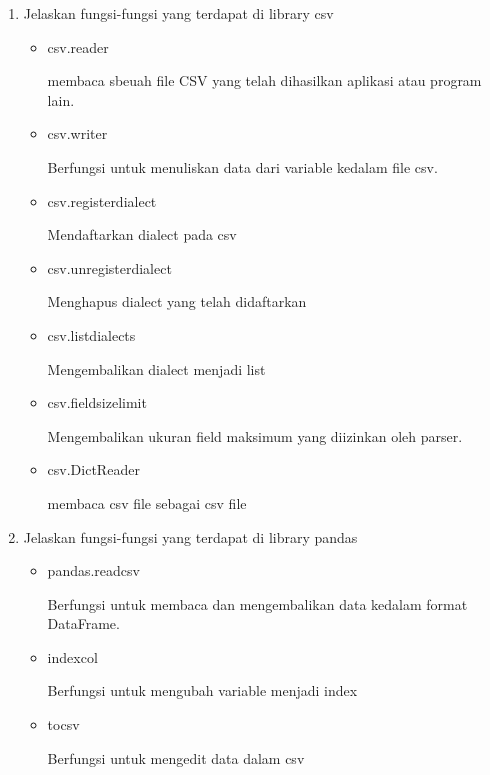 \begin{enumerate}
\item Jelaskan fungsi-fungsi yang terdapat di library csv
\begin{itemize}
	\item csv.reader
	
	membaca sbeuah file CSV yang telah dihasilkan aplikasi atau program lain. 
	
	\item csv.writer
	
	Berfungsi untuk menuliskan data dari variable kedalam file csv.
	
	\item csv.register\textunderscore dialect
	
	Mendaftarkan dialect pada csv
	\item csv.unregister\textunderscore dialect
	
	Menghapus dialect yang telah didaftarkan
	
	\item csv.list\textunderscore dialects
	
	Mengembalikan dialect menjadi list
	
	\item csv.field\textunderscore size\textunderscore limit
	
	Mengembalikan ukuran field maksimum yang diizinkan oleh parser.
	
	\item csv.DictReader
	
	membaca csv file sebagai csv file
	
\end{itemize}

\item Jelaskan fungsi-fungsi yang terdapat di library pandas
\begin{itemize}
	\item pandas.read\textunderscore csv
	
	Berfungsi untuk membaca dan mengembalikan data kedalam format DataFrame. 
	
	\item index\textunderscore col

	Berfungsi untuk mengubah variable menjadi index
	\item to\textunderscore csv
	
	Berfungsi untuk mengedit data dalam csv

\end{itemize}
\end{enumerate}

